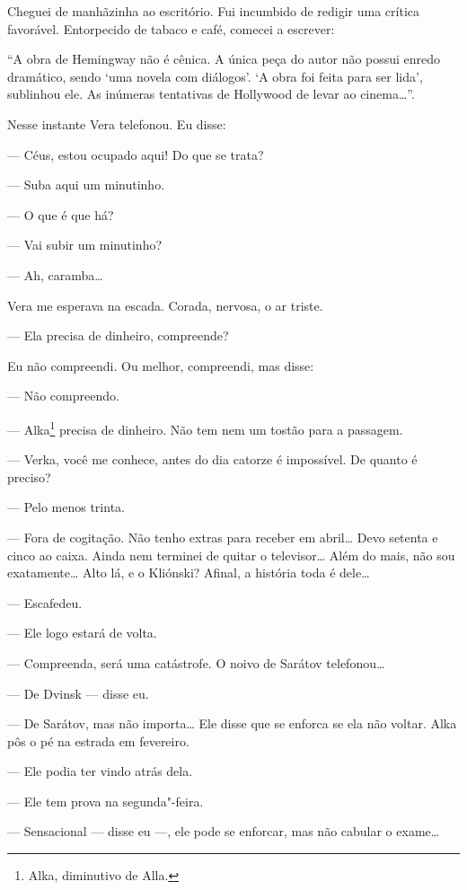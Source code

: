 Cheguei de manhãzinha ao escritório. Fui incumbido de redigir uma
crítica favorável. Entorpecido de tabaco e café, comecei a escrever:

``A obra de Hemingway não é cênica. A única peça do autor não possui
enredo dramático, sendo `uma novela com diálogos'. `A obra foi feita
para ser lida', sublinhou ele. As inúmeras tentativas de Hollywood de
levar ao cinema\ldots{}''.

Nesse instante Vera telefonou. Eu disse:

--- Céus, estou ocupado aqui! Do que se trata?

--- Suba aqui um minutinho.

--- O que é que há?

--- Vai subir um minutinho?

--- Ah, caramba\ldots{}

Vera me esperava na escada. Corada, nervosa, o ar triste.

--- Ela precisa de dinheiro, compreende?

Eu não compreendi. Ou melhor, compreendi, mas disse:

--- Não compreendo.

--- Alka\footnote{Alka, diminutivo de Alla.} precisa de dinheiro. Não
tem nem um tostão para a passagem.

--- Verka, você me conhece, antes do dia catorze é impossível. De quanto
é preciso?

--- Pelo menos trinta.

--- Fora de cogitação. Não tenho extras para receber em abril\ldots{} Devo
setenta e cinco ao caixa. Ainda nem terminei de quitar o
televisor\ldots{} Além do mais, não sou exatamente\ldots{} Alto lá, e o Kliónski?
Afinal, a história toda é dele\ldots{}

--- Escafedeu.

--- Ele logo estará de volta.

--- Compreenda, será uma catástrofe. O noivo de Sarátov telefonou\ldots{}

--- De Dvinsk --- disse eu.

--- De Sarátov, mas não importa\ldots{} Ele disse que se enforca se ela não
voltar. Alka pôs o pé na estrada em fevereiro.

--- Ele podia ter vindo atrás dela.

--- Ele tem prova na segunda"-feira.

--- Sensacional --- disse eu ---, ele pode se enforcar, mas não cabular
o exame\ldots{}

